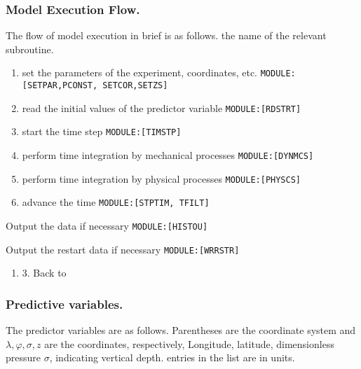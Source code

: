 \hypertarget{model-execution-flow.}{%
\subsubsection{Model Execution Flow.}\label{model-execution-flow.}}

The flow of model execution in brief is as follows. \is the name of the
relevant subroutine.

\begin{enumerate}
\def\labelenumi{\arabic{enumi}.}
\item
  set the parameters of the experiment, coordinates, etc.
  \texttt{MODULE:{[}SETPAR,PCONST,\ SETCOR,SETZS{]}}
\item
  read the initial values of the predictor variable
  \texttt{MODULE:{[}RDSTRT{]}}
\item
  start the time step \texttt{MODULE:{[}TIMSTP{]}}
\item
  perform time integration by mechanical processes
  \texttt{MODULE:{[}DYNMCS{]}}
\item
  perform time integration by physical processes
  \texttt{MODULE:{[}PHYSCS{]}}
\item
  advance the time \texttt{MODULE:{[}STPTIM,\ TFILT{]}}
\end{enumerate}

Output the data if necessary \texttt{MODULE:{[}HISTOU{]}}

Output the restart data if necessary \texttt{MODULE:{[}WRRSTR{]}}

\begin{enumerate}
\def\labelenumi{\arabic{enumi}.}
\setcounter{enumi}{8}
\tightlist
\item
  3. Back to
\end{enumerate}

\hypertarget{predictive-variables.}{%
\subsubsection{Predictive variables.}\label{predictive-variables.}}

The predictor variables are as follows. Parentheses are the coordinate
system and \(\lambda,\varphi,\sigma, z\) are the coordinates,
respectively, Longitude, latitude, dimensionless pressure \(\sigma\),
indicating vertical depth. \The entries in the list are in units.


